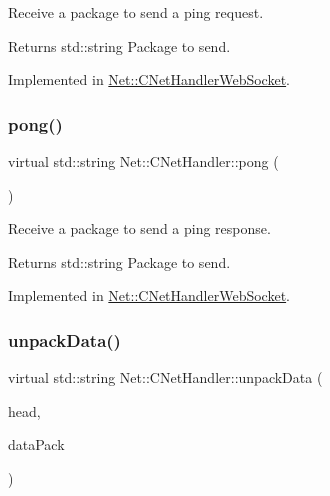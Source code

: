 Receive a package to send a ping request. 

\begin{DoxyReturn}{Returns}
std\+::string Package to send. 
\end{DoxyReturn}


Implemented in \mbox{\hyperlink{class_net_1_1_c_net_handler_web_socket_aa19e13e42fa3a31ab8d8a8291af4b5e6}{Net\+::\+C\+Net\+Handler\+Web\+Socket}}.

\mbox{\label{class_net_1_1_c_net_handler_a818189d3332d68cf28d30ec31bed0e17}} 
\subsubsection{\texorpdfstring{pong()}{pong()}}
{\footnotesize\ttfamily virtual std\+::string Net\+::\+C\+Net\+Handler\+::pong (\begin{DoxyParamCaption}{ }\end{DoxyParamCaption})\hspace{0.3cm}{\ttfamily [pure virtual]}}



Receive a package to send a ping response. 

\begin{DoxyReturn}{Returns}
std\+::string Package to send. 
\end{DoxyReturn}


Implemented in \mbox{\hyperlink{class_net_1_1_c_net_handler_web_socket_a51d3618ba601abc5047cf0da91b8a374}{Net\+::\+C\+Net\+Handler\+Web\+Socket}}.

\mbox{\label{class_net_1_1_c_net_handler_aea2d09ea3bfa8d7a13ace3aec6ba9356}} 
\subsubsection{\texorpdfstring{unpack\+Data()}{unpackData()}}
{\footnotesize\ttfamily virtual std\+::string Net\+::\+C\+Net\+Handler\+::unpack\+Data (\begin{DoxyParamCaption}\item[{const \mbox{\hyperlink{struct_net_1_1_s_message_head}{S\+Message\+Head}} \&}]{head,  }\item[{const std\+::string \&}]{data\+Pack }\end{DoxyParamCaption})\hspace{0.3cm}{\ttfamily [pure virtual]}}



